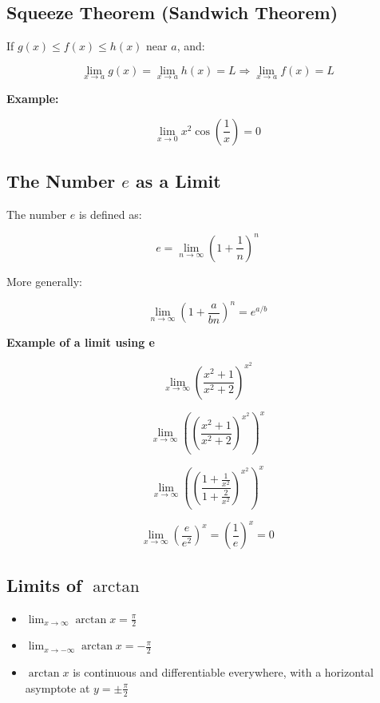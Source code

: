 \subsection{Squeeze Theorem (Sandwich Theorem)}

If \(g(x) \le f(x) \le h(x)\) near \(a\), and:

\[
    \lim_{x \to a} g(x) = \lim_{x \to a} h(x) = L
    \Rightarrow \lim_{x \to a} f(x) = L
\]

\textbf{Example:}

\[
    \lim_{x \to 0} x^2 \cos\left( \frac{1}{x} \right) = 0
\]

\subsection{The Number \texorpdfstring{\(e\)}{e} as a Limit}

The number \(e\) is defined as:

\[
    e = \lim_{n \to \infty} {\left(1 + \frac{1}{n} \right)}^n
\]

More generally:

\[
    \lim_{n \to \infty} {\left(1 + \frac{a}{bn} \right)}^n = e^{a/b}
\]

\textbf{Example of a limit using e}

\[
    \lim_{x \to \infty}{\left(\frac{x^2 + 1}{x^2 +2}\right)}^{x^2}
\]

\[
    \lim_{x \to \infty} {\left({\left(\frac{x^2 + 1}{x^2 +2}\right)}^{x^2}\right)}^x
\]

\[
    \lim_{x \to \infty} {\left({\left(\frac{1 + \frac{1}{x^2}}{1 + \frac{2}{x^2}}\right)}^{x^2}\right)}^x
\]

\[
    \lim_{x \to \infty} {\left(\frac{e}{e^2}\right)}^x = {\left(\frac{1}{e}\right)}^x = 0
\]


\subsection{Limits of \texorpdfstring{\(\arctan\)}{arctan}}

\begin{itemize}

    \item \(\displaystyle \lim_{x \to \infty} \arctan x = \frac{\pi}{2}\)

    \item \(\displaystyle \lim_{x \to -\infty} \arctan x = -\frac{\pi}{2}\)


    \item \(\arctan x\) is continuous and differentiable everywhere, with a horizontal asymptote at 
    \(y = \pm \frac{\pi}{2}\)

\end{itemize}

